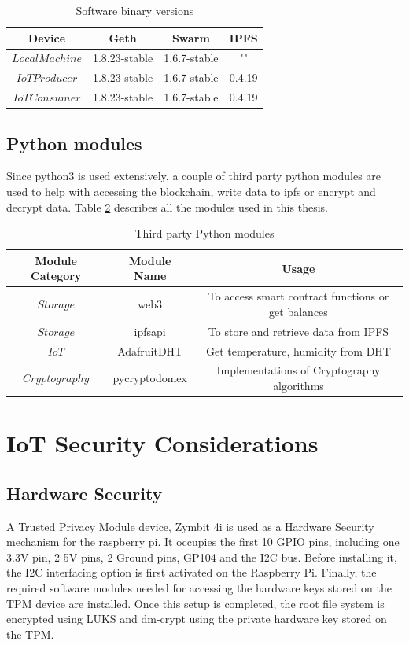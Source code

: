 \documentclass[11pt,openright]{report}
\begin{document}
\begin{table}[!htbp]
	\renewcommand{\arraystretch}{1}
	\caption{Software binary versions}
	\label{software_version}
	\centering
	\begin{tabular}{|c|c|c|c|}
		\hline
		\bfseries Device & \bfseries Geth & \bfseries Swarm  & \bfseries IPFS\\
		\hline\hline
		$Local Machine$ & 1.8.23-stable & 1.6.7-stable & "" \\ \hline
		$IoT Producer$ & 1.8.23-stable & 1.6.7-stable & 0.4.19 \\ \hline
		$IoT Consumer$ & 1.8.23-stable & 1.6.7-stable & 0.4.19 \\ \hline
	\end{tabular}
\end{table}

\subsection{Python modules}
Since python3 is used extensively, a couple of third party python modules are used to help with accessing the blockchain, write data to ipfs or encrypt and decrypt data. Table \ref{python_modules} describes all the modules used in this thesis.
\begin{table}[!htbp]
	\renewcommand{\arraystretch}{1.3}
	\caption{Third party Python modules}
	\label{python_modules}
	\centering
	\begin{tabular}{|c|c|c|}
		\hline
		\bfseries Module Category & \bfseries Module Name & \bfseries Usage \\
		\hline\hline
		$Storage$ & web3 & To access smart contract functions or get balances \\ \hline
		$Storage$ & ipfsapi & To store and retrieve data from IPFS \\ \hline
		$IoT$ & AdafruitDHT & Get temperature, humidity from DHT \\ \hline
		$Cryptography$ & pycryptodomex & Implementations of Cryptography algorithms \\ \hline
	\end{tabular}
\end{table}



\section{IoT Security Considerations}
\subsection{Hardware Security}
A Trusted Privacy Module device, Zymbit 4i is used as a Hardware Security mechanism for the raspberry pi. It occupies the first 10 GPIO pins, including one 3.3V pin, 2 5V pins, 2 Ground pins, GP104 and the I2C bus. Before installing it, the I2C interfacing option is first activated on the Raspberry Pi. Finally, the required software modules needed for accessing the hardware keys stored on the TPM device are installed. Once this setup is completed, the root file system is encrypted using LUKS and dm-crypt using the private hardware key stored on the TPM.
\end{document}
